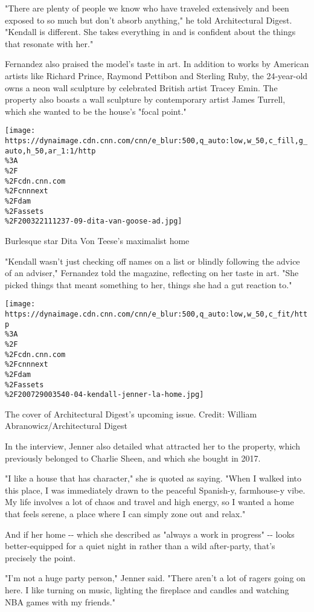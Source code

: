 "There are plenty of people we know who have traveled extensively and
been exposed to so much but don't absorb anything," he told
Architectural Digest. "Kendall is different. She takes everything in and
is confident about the things that resonate with her."

Fernandez also praised the model's taste in art. In addition to works by
American artists like Richard Prince, Raymond Pettibon and Sterling
Ruby, the 24-year-old owns a neon wall sculpture by celebrated British
artist Tracey Emin. The property also boasts a wall sculpture by
contemporary artist James Turrell, which she wanted to be the house's
"focal point."

\href{/style/article/dita-von-teese-los-angeles-home-architectural-digest/index.html}{}

\texttt{[image: https://dynaimage.cdn.cnn.com/cnn/e\_blur:500,q\_auto:low,w\_50,c\_fill,g\_auto,h\_50,ar\_1:1/http\\\%3A\\\%2F\\\%2Fcdn.cnn.com\\\%2Fcnnnext\\\%2Fdam\\\%2Fassets\\\%2F200322111237-09-dita-van-goose-ad.jpg]}

Burlesque star Dita Von Teese's maximalist home

"Kendall wasn't just checking off names on a list or blindly following
the advice of an adviser," Fernandez told the magazine, reflecting on
her taste in art. "She picked things that meant something to her, things
she had a gut reaction to."

\texttt{[image: https://dynaimage.cdn.cnn.com/cnn/e\_blur:500,q\_auto:low,w\_50,c\_fit/http\\\%3A\\\%2F\\\%2Fcdn.cnn.com\\\%2Fcnnnext\\\%2Fdam\\\%2Fassets\\\%2F200729003540-04-kendall-jenner-la-home.jpg]}

The cover of Architectural Digest's upcoming issue. Credit: William
Abranowicz/Architectural Digest

In the interview, Jenner also detailed what attracted her to the
property, which previously belonged to Charlie Sheen, and which she
bought in 2017.

"I like a house that has character," she is quoted as saying. "When I
walked into this place, I was immediately drawn to the peaceful
Spanish-y, farmhouse-y vibe. My life involves a lot of chaos and travel
and high energy, so I wanted a home that feels serene, a place where I
can simply zone out and relax."

And if her home -\/- which she described as "always a work in progress"
-\/- looks better-equipped for a quiet night in rather than a wild
after-party, that's precisely the point.

"I'm not a huge party person," Jenner said. "There aren't a lot of
ragers going on here. I like turning on music, lighting the fireplace
and candles and watching NBA games with my friends."

